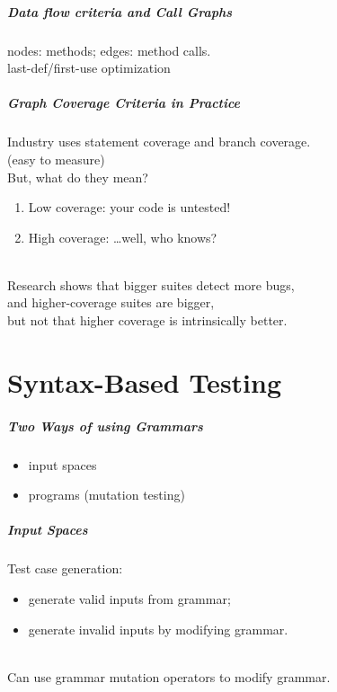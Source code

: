 \documentclass{beamer}
\newenvironment{changemargin}[1]{%
  \begin{list}{}{%
    \setlength{\topsep}{0pt}%
    \setlength{\leftmargin}{#1}%
    \setlength{\rightmargin}{1em}
    \setlength{\listparindent}{\parindent}%
    \setlength{\itemindent}{\parindent}%
    \setlength{\parsep}{\parskip}%
  }%
  \item[]}{\end{list}}
\begin{document}
\begin{frame}
  \frametitle{Data flow criteria and Call Graphs}
  \begin{changemargin}{2cm}
    nodes: methods; edges: method calls.\\[1em]
    last-def/first-use optimization
  \end{changemargin}
\end{frame}

\begin{frame}
  \frametitle{Graph Coverage Criteria in Practice}
  \begin{changemargin}{1cm}
    Industry uses statement coverage and branch coverage.\\
      \hspace*{2em} (easy to measure)\\[1em]
      But, what do they mean?
      \begin{enumerate}
      \item Low coverage: your code is untested!
      \item High coverage: \ldots well, who knows?
      \end{enumerate}~\\[.5em]
      Research shows that bigger suites detect more bugs,\\
      and higher-coverage suites are bigger,\\
      but not that higher coverage is intrinsically better.
  \end{changemargin}
\end{frame}
      
\part{Syntax-Based Testing}
\begin{frame}
\partpage
\end{frame}

\begin{frame}
  \frametitle{Two Ways of using Grammars}
  \begin{changemargin}{2cm}
    \Large
    \begin{itemize}
    \item input spaces
    \item programs (mutation testing)
    \end{itemize}
  \end{changemargin}
\end{frame}

\begin{frame}
  \frametitle{Input Spaces}
  \begin{changemargin}{1.5cm}
    \Large
    Test case generation:
    \begin{itemize}
    \item generate valid inputs from grammar;
    \item generate invalid inputs by modifying grammar.
    \end{itemize}~\\
    Can use grammar mutation operators to modify grammar.
  \end{changemargin}
\end{frame}
\end{document}
